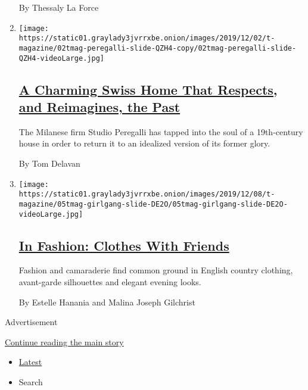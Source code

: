 \begin{enumerate}
  By Thessaly La Force
\item
  \texttt{[image: https://static01.graylady3jvrrxbe.onion/images/2019/12/02/t-magazine/02tmag-peregalli-slide-QZH4-copy/02tmag-peregalli-slide-QZH4-videoLarge.jpg]}

  \hypertarget{a-charming-swiss-home-that-respects-and-reimagines-the-past}{%
  \subsection{\texorpdfstring{\href{/2019/12/02/t-magazine/swiss-home-studio-peregalli.html}{A
  Charming Swiss Home That Respects, and Reimagines, the
  Past}}{A Charming Swiss Home That Respects, and Reimagines, the Past}}\label{a-charming-swiss-home-that-respects-and-reimagines-the-past}}

  The Milanese firm Studio Peregalli has tapped into the soul of a
  19th-century house in order to return it to an idealized version of
  its former glory.

  By Tom Delavan
\item
  \texttt{[image: https://static01.graylady3jvrrxbe.onion/images/2019/12/08/t-magazine/05tmag-girlgang-slide-DE2O/05tmag-girlgang-slide-DE2O-videoLarge.jpg]}

  \hypertarget{in-fashion-clothes-with-friends}{%
  \subsection{\texorpdfstring{\href{/2019/12/02/t-magazine/clothes-with-friends.html}{In
  Fashion: Clothes With
  Friends}}{In Fashion: Clothes With Friends}}\label{in-fashion-clothes-with-friends}}

  Fashion and camaraderie find common ground in English country
  clothing, avant-garde silhouettes and elegant evening looks.

  By Estelle Hanania and Malina Joseph Gilchrist
\end{enumerate}

Advertisement

\protect\hyperlink{after-mid1}{Continue reading the main story}

\begin{itemize}
\tightlist
\item
  \protect\hyperlink{stream-panel}{Latest}
\item
  Search
\end{itemize}

